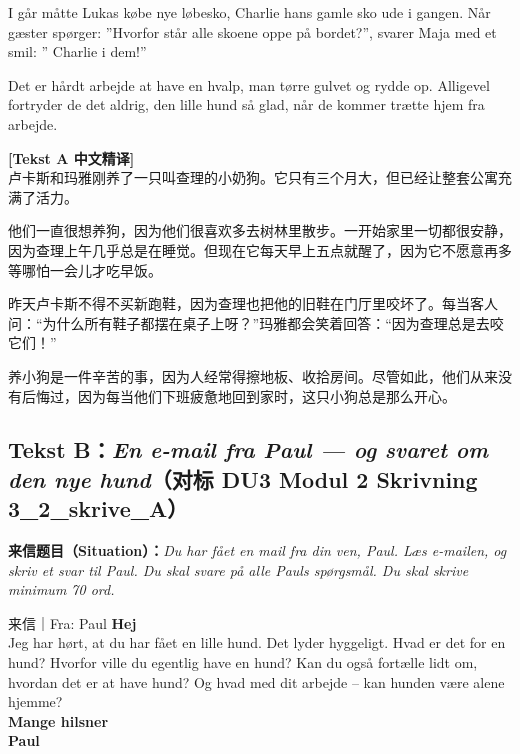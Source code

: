 I går måtte Lukas købe nye løbesko,  Charlie  hans gamle sko ude i gangen. Når gæster spørger: ”Hvorfor står alle skoene oppe på bordet?”, svarer Maja med et smil: ” Charlie  i dem!”

Det er hårdt arbejde at have en hvalp,  man  tørre gulvet og rydde op. Alligevel fortryder de det aldrig,  den lille hund  så glad, når de kommer trætte hjem fra arbejde.

\begin{transbox}
\small
\textbf{\color{NCDTeal}[Tekst A 中文精译]}\\
卢卡斯和玛雅刚养了一只叫查理的小奶狗。它只有三个月大，但已经让整套公寓充满了活力。

他们一直很想养狗，因为他们很喜欢多去树林里散步。一开始家里一切都很安静，因为查理上午几乎总是在睡觉。但现在它每天早上五点就醒了，因为它不愿意再多等哪怕一会儿才吃早饭。

昨天卢卡斯不得不买新跑鞋，因为查理也把他的旧鞋在门厅里咬坏了。每当客人问：“为什么所有鞋子都摆在桌子上呀？”玛雅都会笑着回答：“因为查理总是去咬它们！”

养小狗是一件辛苦的事，因为人经常得擦地板、收拾房间。尽管如此，他们从来没有后悔过，因为每当他们下班疲惫地回到家时，这只小狗总是那么开心。
\end{transbox}

\subsection*{Tekst B：\textit{En e-mail fra Paul --- og svaret om den nye hund}（对标 DU3 Modul 2 Skrivning 3\_2\_skrive\_A）}

\textbf{来信题目（Situation）：}\textit{Du har fået en mail fra din ven, Paul. Læs e-mailen, og skriv et svar til Paul. Du skal svare på alle Pauls spørgsmål. Du skal skrive minimum 70 ord.}

\begin{emailbox}{来信｜Fra: Paul}
\textbf{Hej}\\
Jeg har hørt, at du har fået en lille hund. Det lyder hyggeligt. Hvad er det for en hund? Hvorfor ville du egentlig have en hund? Kan du også fortælle lidt om, hvordan det er at have hund? Og hvad med dit arbejde -- kan hunden være alene hjemme?\\
\textbf{Mange hilsner}\\
\textbf{Paul}
\end{emailbox}

